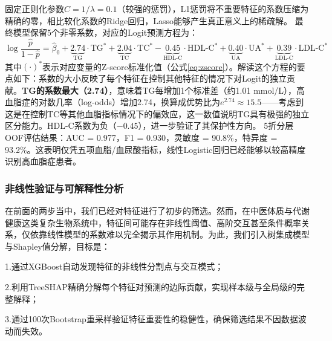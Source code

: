 \documentclass[12pt,a4paper]{ctexart}
\begin{document}
固定正则化参数$C = 1/\lambda = 0.1$（较强的惩罚），L1惩罚将不重要特征的系数压缩为精确的零，相比软化系数的Ridge回归，Lasso能够产生真正意义上的稀疏解。
最终模型保留5个非零系数，对应的Logit预测方程为：
\begin{equation}
\log\frac{\hat{p}}{1-\hat{p}} = \hat{\beta}_0 + \underbrace{2.74}_{\text{TG}} \cdot \text{TG}^* + \underbrace{2.04}_{\text{TC}} \cdot \text{TC}^* - \underbrace{0.45}_{\text{HDL-C}} \cdot \text{HDL-C}^* + \underbrace{0.40}_{\text{UA}} \cdot \text{UA}^* + \underbrace{0.39}_{\text{LDL-C}} \cdot \text{LDL-C}^*
\label{eq:logit_hld}
\end{equation}
其中$(\cdot)^*$表示对应变量的Z-score标准化值（公式\ref{eq:zscore}）。解读这个方程的要点如下：系数的大小反映了每个特征在控制其他特征的情况下对Logit的独立贡献。\textbf{TG的系数最大（2.74）}，意味着TG每增加1个标准差（约1.01 mmol/L），高血脂症的对数几率（log-odds）增加2.74，换算成优势比为$e^{2.74} \approx 15.5$——考虑到这是在控制TC等其他血脂指标情况下的偏效应，这一数值说明TG具有极强的独立区分能力。HDL-C系数为负（$-0.45$），进一步验证了其保护性方向。
5折分层OOF评估结果：AUC = 0.977，F1 = 0.930，灵敏度 = 90.8\%，特异度 = 93.2\%。这表明仅凭五项血脂/血尿酸指标，线性Logistic回归已经能够以较高精度识别高血脂症患者。

\subsubsection{非线性验证与可解释性分析}
在前面的两步当中，我们已经对特征进行了初步的筛选。然而，在中医体质与代谢健康这类复杂生物系统中，特征间可能存在非线性阈值、高阶交互甚至条件概率关系，仅依靠线性模型的系数难以完全揭示其作用机制。为此，我们引入树集成模型与Shapley值分解，目标是：

1.通过XGBoost自动发现特征的非线性分割点与交互模式；

2.利用TreeSHAP精确分解每个特征对预测的边际贡献，实现样本级与全局级的完整解释；

3.通过100次Bootstrap重采样验证特征重要性的稳健性，确保筛选结果不因数据波动而失效。
\end{document}
